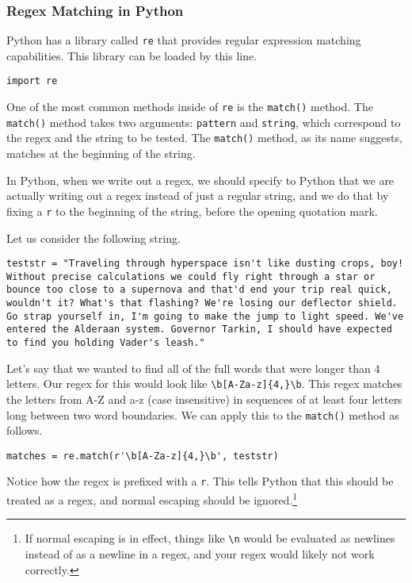 \subsubsection{Regex Matching in Python}
Python has a library called \verb|re| that provides regular expression matching capabilities. This library can be loaded by this line.\par
\begin{lstlisting}[style=pippython]
import re
\end{lstlisting}
One of the most common methods inside of \verb|re| is the \verb|match()| method. The \verb|match()| method takes two arguments: \verb|pattern| and \verb|string|, which correspond to the regex and the string to be tested. The \verb|match()| method, as its name suggests, matches at the beginning of the string.\par
In Python, when we write out a regex, we should specify to Python that we are actually writing out a regex instead of just a regular string, and we do that by fixing a \verb|r| to the beginning of the string, before the opening quotation mark.\par
Let us consider the following string.\par
\begin{lstlisting}[style=pippython]
teststr = "Traveling through hyperspace isn't like dusting crops, boy! Without precise calculations we could fly right through a star or bounce too close to a supernova and that'd end your trip real quick, wouldn't it? What's that flashing? We're losing our deflector shield. Go strap yourself in, I'm going to make the jump to light speed. We've entered the Alderaan system. Governor Tarkin, I should have expected to find you holding Vader's leash."
\end{lstlisting}
Let's say that we wanted to find all of the full words that were longer than 4 letters. Our regex for this would look like \verb|\b[A-Za-z]{4,}\b|. This regex matches the letters from A-Z and a-z (case insensitive) in sequences of at least four letters long between two word boundaries. We can apply this to the \verb|match()| method as follows.\par
\begin{lstlisting}[style=pippython]
matches = re.match(r'\b[A-Za-z]{4,}\b', teststr)
\end{lstlisting}
Notice how the regex is prefixed with a \verb|r|. This tells Python that this should be treated as a regex, and normal escaping should be ignored.\cprotect\footnote{If normal escaping is in effect, things like \verb|\n| would be evaluated as newlines instead of as a newline in a regex, and your regex would likely not work correctly.}\par
